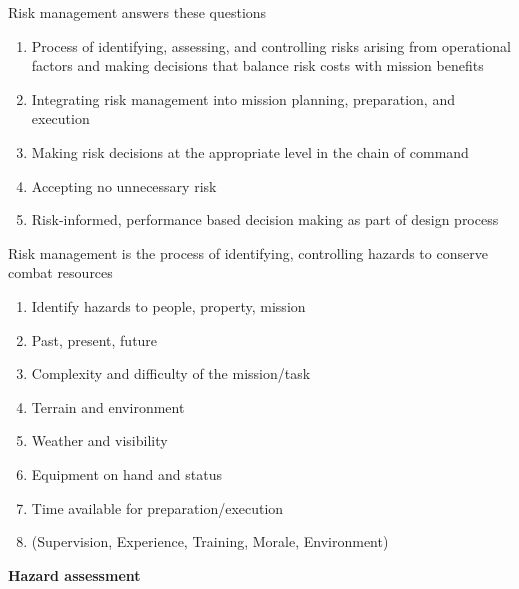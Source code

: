 \documentclass[aspectratio=1610,pdftex,dvipsnames,compress,xcolor={dvipsnames}]{beamer}
\begin{document}
\begin{frame}{Risk management answers these questions}
    \begin{enumerate}[series=outerlist,topsep=0pt,itemsep=21pt,leftmargin=*,label=(\arabic*)]
        \item[]Process of identifying, assessing, and controlling risks arising from operational factors and making decisions that balance risk costs with mission benefits 
        \item[]Integrating risk management into mission planning, preparation, and execution
        \item[]Making risk decisions at the appropriate level in the chain of command
        \item[]Accepting no unnecessary risk
        \item[]Risk-informed, performance based decision making as part of design process
    \end{enumerate}
\end{frame}


\begin{frame}{Risk management is the process of identifying, controlling hazards to conserve combat resources}
    \begin{enumerate}[series=outerlist,topsep=0pt,itemsep=11pt,leftmargin=*,label=(\arabic*)]
        \item[]Identify hazards to people, property, mission  
        \item[]Past, present, future  
        \item[]Complexity and difficulty of the mission/task  
        \item[]Terrain and environment  
        \item[]Weather and visibility  
        \item[]Equipment on hand and status 
        \item[]Time available for preparation/execution  
        \item[](Supervision, Experience, Training, Morale, Environment)
    \end{enumerate}
\end{frame}


\begin{frame}[plain]{}
    \centering\LARGE\textbf{Hazard assessment}
\end{frame}
\end{document}
